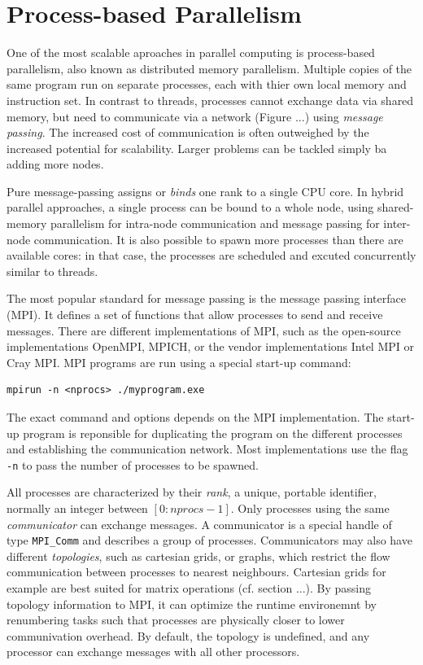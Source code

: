 \section{Process-based Parallelism}

One of the most scalable aproaches in parallel computing is process-based parallelism, also known as distributed memory parallelism. Multiple copies of the same program run on separate processes, each with thier own local memory and instruction set. In contrast to threads, processes cannot exchange data via shared memory, but need to communicate via a network (Figure ...) using \emph{message passing}. The increased cost of communication is often outweighed by the increased potential for scalability. Larger problems can be tackled simply ba adding more nodes. 

Pure message-passing assigns or \emph{binds} one rank to a single CPU core. In hybrid parallel approaches, a single process can be bound to a whole node, using shared-memory parallelism for intra-node communication and message passing for inter-node communication. It is also possible to spawn more processes than there are available cores: in that case, the processes are scheduled and excuted concurrently similar to threads.

The most popular standard for message passing is the message passing interface (MPI). It defines a set of functions that allow processes to send and receive messages. There are different implementations of MPI, such as the open-source implementations OpenMPI, MPICH, or the vendor implementations Intel MPI or Cray MPI. MPI programs are run using a special start-up command:
\begin{lstlisting}[backgroundcolor=\color{light-gray},breaklines=true]
mpirun -n <nprocs> ./myprogram.exe 
\end{lstlisting}
\noindent The exact command and options depends on the MPI implementation. The start-up program is reponsible for duplicating the program on the different processes and establishing the communication network. Most implementations use the flag \texttt{-n} to pass the number of processes to be spawned. 

All processes are characterized by their \emph{rank}, a unique, portable identifier, normally an integer between $[0:nprocs-1]$. Only processes using the same \emph{communicator} can exchange messages. A communicator is a special handle of type \texttt{MPI{\_}Comm} and describes a group of processes. Communicators may also have different \emph{topologies}, such as cartesian grids, or  graphs, which restrict the flow communication between processes to nearest neighbours. Cartesian grids for example are best suited for matrix operations (cf. section ...). By passing topology information to MPI, it can optimize the runtime environemnt by renumbering tasks such that processes are physically closer to lower communivation overhead. By default, the topology is undefined, and any processor can exchange messages with all other processors.

